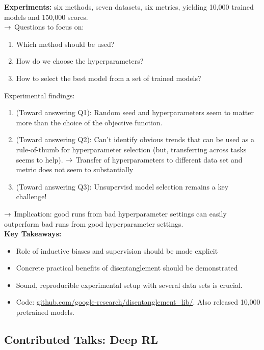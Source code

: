 {\bf Experiments:} six methods, seven datasets, six metrics, yielding 10,000 trained models and 150,000 scores. \\

$\rightarrow$ Questions to focus on:
\begin{enumerate}[Q1]
    \item Which method should be used?
    \item How do we choose the hyperparameters?
    \item How to select the best model from a set of trained models?
\end{enumerate}

Experimental findings:
\begin{enumerate}
    \item (Toward answering Q1): Random seed and hyperparameters seem to matter more than the choice of the objective function.
    \item (Toward answering Q2): Can't identify obvious trends that can be used as a rule-of-thumb for hyperparameter selection (but, transferring across tasks seems to help).
    $\rightarrow$ Transfer of hyperparameters to different data set and metric does not seem to substantially
    \item (Toward answering Q3):  Unsupervisd model selection remains a key challenge!
\end{enumerate}

$\rightarrow$ Implication: good runs from bad hyperparameter settings can easily outperform bad runs from good hyperparameter settings. \\

{\bf Key Takeaways:}
\begin{itemize}
    \item Role of inductive biases and supervision should be made explicit
    \item Concrete practical benefits of disentanglement should be demonstrated
    \item Sound, reproducible experimental setup with several data sets is crucial.
    \item Code: \url{github.com/google-research/disentanglement_lib/}. Also released 10,000 pretrained models.
\end{itemize}


\spacerule


\subsection{Contributed Talks: Deep RL}

